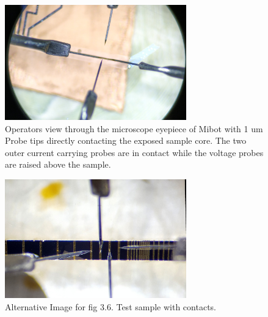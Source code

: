 \begin{figure}[t]
  \centering
    \includegraphics[width=0.7\textwidth]{fig/MiBots/IMG_20190409_143016.jpg}
 \caption{ Operators view through the microscope eyepiece of Mibot with 1 um Probe tips directly contacting the exposed sample core. The two outer current carrying probes are in contact while the voltage probes are raised above the sample.}
\label{mibot}
\end{figure}

\begin{figure}[t]
  \centering
    \includegraphics[width=0.7\textwidth]{fig/MiBots/closeup.jpg}
 \caption{Alternative Image for fig 3.6. Test sample with contacts. }
\label{mibot}
\end{figure}

 \cleardoublepage